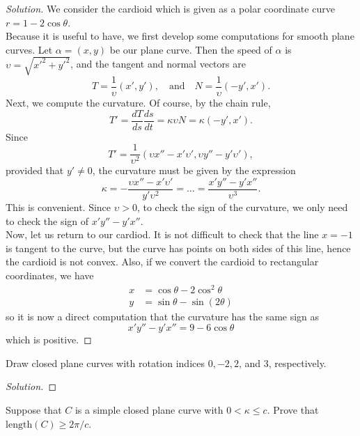 \documentclass[Shifrin_Solutions_Spring_2018]{subfiles}
\begin{document}
\begin{proof}[Solution] We consider the cardioid which is given as a polar coordinate curve $r = 1-2\cos \theta$.\\


Because it is useful to have, we first develop some computations for smooth plane curves.  Let $\alpha = (x,y)$ be our plane curve. Then the speed of $\alpha$ is $\upsilon = \sqrt{x'^2 +y'^2}$, and  the tangent and normal vectors are
\[
T  = \dfrac{1}{\upsilon}\left( x', y' \right) , \quad\mbox{and} \quad N = \dfrac{1}{\upsilon}\left(-y', x'\right).
\]
Next, we compute the curvature. Of course, by the chain rule,
\[
T' = \dfrac{dT}{ds}\dfrac{ds}{dt} = \kappa \upsilon N = \kappa \left( -y', x'\right) .
\]
Since
\[
T' = \dfrac{1}{\upsilon^2} \left( \upsilon x'' - x' \upsilon' , \upsilon y'' - y'\upsilon' \right),
\]
provided that $y' \neq 0$, the curvature must be given by the expression
\[
\kappa = -  \dfrac{\upsilon x'' - x' \upsilon'}{y'\upsilon^2} = \dots =\dfrac{x'y'' - y'x''}{\upsilon^3} .
\]
This is convenient. Since $\upsilon>0$, to check the sign of the curvature, we only need to check the sign of $x'y'' - y'x''$.\\

Now, let us return to our cardiod. It is not difficult to check that the line $x=-1$ is tangent to the curve, but the curve has points on both sides of this line, hence the cardioid is not convex. Also, if we convert the cardioid to rectangular coordinates, we have
\begin{align*}
x &= \cos \theta - 2\cos^2\theta \\
y& = \sin\theta - \sin(2\theta)
\end{align*}
so it is now a direct computation that the curvature has the same sign as
\[
x'y''-y'x''  = 9-6\cos\theta
\]
which is positive.
\end{proof}


\begin{exercise} Draw closed plane curves with rotation indices $0, -2, 2$, and $3$, respectively.
\end{exercise}

\begin{proof}[Solution]
\end{proof}


\begin{exercise} Suppose that $C$ is a simple closed plane curve with $0 < \kappa \leq c$. Prove that $\mathrm{length}(C) \geq 2\pi / c$.
\end{exercise}
\end{document}
